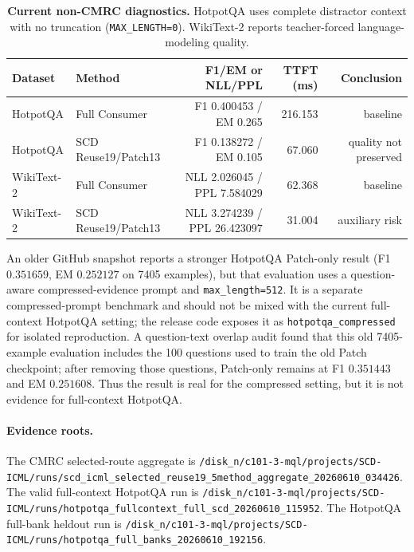 \begin{table}[t]
  \centering
  \small
  \caption{\textbf{Current non-CMRC diagnostics.}
  HotpotQA uses complete distractor context with no truncation
  (\texttt{MAX\_LENGTH=0}).  WikiText-2 reports teacher-forced
  language-modeling quality.}
  \label{tab:current_non_cmrc_diagnostics}
  \setlength{\tabcolsep}{4pt}
  \begin{tabular}{llrrr}
    \toprule
    \textbf{Dataset} & \textbf{Method} & \textbf{F1/EM or NLL/PPL} & \textbf{TTFT (ms)} & \textbf{Conclusion} \\
    \midrule
    HotpotQA & Full Consumer & F1 0.400453 / EM 0.265 & 216.153 & baseline \\
    HotpotQA & SCD Reuse19/Patch13 & F1 0.138272 / EM 0.105 & 67.060 & quality not preserved \\
    WikiText-2 & Full Consumer & NLL 2.026045 / PPL 7.584029 & 62.368 & baseline \\
    WikiText-2 & SCD Reuse19/Patch13 & NLL 3.274239 / PPL 26.423097 & 31.004 & auxiliary risk \\
    \bottomrule
  \end{tabular}
\end{table}

An older GitHub snapshot reports a stronger HotpotQA Patch-only result
(F1 $0.351659$, EM $0.252127$ on 7405 examples), but that evaluation uses a
question-aware compressed-evidence prompt and \texttt{max\_length=512}.  It is a
separate compressed-prompt benchmark and should not be mixed with the current
full-context HotpotQA setting; the release code exposes it as
\texttt{hotpotqa\_compressed} for isolated reproduction.  A question-text overlap audit found that this
old 7405-example evaluation includes the 100 questions used to train the old
Patch checkpoint; after removing those questions, Patch-only remains at F1
$0.351443$ and EM $0.251608$.  Thus the result is real for the compressed
setting, but it is not evidence for full-context HotpotQA.

\paragraph{Evidence roots.}
The CMRC selected-route aggregate is
\texttt{/disk\_n/c101-3-mql/projects/SCD-ICML/runs/scd\_icml\_selected\_reuse19\_5method\_aggregate\_20260610\_034426}.
The valid full-context HotpotQA run is
\texttt{/disk\_n/c101-3-mql/projects/SCD-ICML/runs/hotpotqa\_fullcontext\_full\_scd\_20260610\_115952}.
The HotpotQA full-bank heldout run is
\texttt{/disk\_n/c101-3-mql/projects/SCD-ICML/runs/hotpotqa\_full\_banks\_20260610\_192156}.
